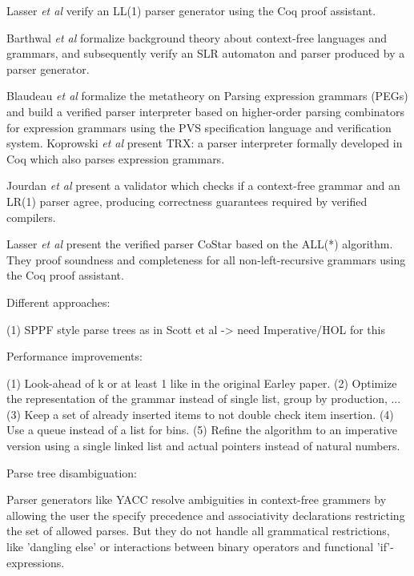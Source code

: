 \begin{isabellebody}
\begin{isamarkuptext}
Lasser \textit{et al} \cite{Lasser:2019} verify an LL(1) parser generator using the Coq proof assistant.

Barthwal \textit{et al} \cite{Barthwal:2009} formalize background theory
about context-free languages and grammars, and subsequently verify an SLR automaton and parser produced
by a parser generator.

Blaudeau \textit{et al} \cite{Blaudeau:2020} formalize the metatheory on Parsing expression grammars (PEGs) and
build a verified parser interpreter based on higher-order parsing combinators for expression grammars
using the PVS specification language and verification system. Koprowski \textit{et al} \cite{Koprowski:2011}
present TRX: a parser interpreter formally developed in Coq which also parses expression grammars.

Jourdan \textit{et al} \cite{Jourdan:2012} present a validator which checks if a context-free grammar
and an LR(1) parser agree, producing correctness guarantees required by verified compilers.

Lasser \textit{et al} \cite{Lasser:2021} present the verified parser CoStar based on the ALL(*) algorithm.
They proof soundness and completeness for all non-left-recursive grammars using the Coq proof assistant.%
\end{isamarkuptext}\isamarkuptrue%
%
\isadelimdocument
%
\endisadelimdocument
%
\isatagdocument
%
\isamarkuptrue%
%
\endisatagdocument
{\isafolddocument}%
%
\isadelimdocument
%
\endisadelimdocument
%
\begin{isamarkuptext}%
Different approaches:

(1) SPPF style parse trees as in Scott et al -> need Imperative/HOL for this

Performance improvements:

(1) Look-ahead of k or at least 1 like in the original Earley paper.
(2) Optimize the representation of the grammar instead of single list, group by production, ...
(3) Keep a set of already inserted items to not double check item insertion.
(4) Use a queue instead of a list for bins.
(5) Refine the algorithm to an imperative version using a single linked list and actual pointers instead
    of natural numbers.%
\end{isamarkuptext}\isamarkuptrue%
%
\begin{isamarkuptext}%
Parse tree disambiguation:

Parser generators like YACC resolve ambiguities in context-free grammers by allowing the user
the specify precedence and associativity declarations restricting the set of allowed parses. But they
do not handle all grammatical restrictions, like 'dangling else' or interactions between binary operators
and functional 'if'-expressions.


\end{isamarkuptext}
\end{isabellebody}
